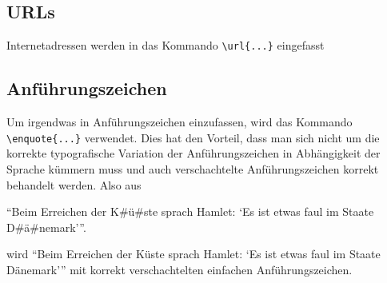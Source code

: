 \subsection{URLs}

Internetadressen werden in das Kommando \verb#\url{...}# eingefasst

\subsection{Anführungszeichen}

Um irgendwas in Anführungszeichen einzufassen, wird das Kommando 
\verb#\enquote{...}# verwendet. Dies hat den Vorteil, dass man sich nicht um die
korrekte typografische Variation der Anführungszeichen in Abhängigkeit der
Sprache kümmern muss und auch verschachtelte Anführungszeichen korrekt behandelt
werden. Also aus
\begin{latex}[caption={Behandlung von Anführungszeichen},label={lst:quotes},escapechar=\#]
 \enquote{Beim Erreichen der K#ü#ste sprach Hamlet: \enquote{Es ist etwas faul im Staate D#ä#nemark}}.
\end{latex}
wird \enquote{Beim Erreichen der Küste sprach Hamlet: \enquote{Es ist etwas faul
im Staate Dänemark}} mit korrekt verschachtelten einfachen Anführungszeichen.